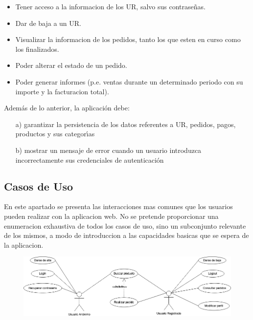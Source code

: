 \documentclass[a4paper]{report}
\begin{document}
\begin{enumerate}
\begin{itemize}
                    \item Tener acceso a la informacion de los UR, salvo sus contrase\~nas.
                    \item Dar de baja a un UR.
                    \item Visualizar la informacion de los pedidos, tanto los que esten en curso como los finalizados.
                    \item Poder alterar el estado de un pedido.
                    \item Poder generar informes (p.e. ventas durante un determinado periodo con su importe y la facturacion total).
                \end{itemize}
            \end{enumerate}

            Adem\'as de lo anterior, la aplicaci\'on debe:
            \begin{enumerate}
                \item[a)] garantizar la persistencia de los datos referentes a UR, pedidos, pagos, productos y sus categor\'\i{}as
                \item[b)] mostrar un mensaje de error cuando un usuario introduzca incorrectamente sus credenciales de autenticaci\'on
            \end{enumerate}

        \subsection{Casos de Uso}
            En este apartado se presenta las interacciones mas comunes que los usuarios pueden realizar con la aplicacion web.
            No se pretende proporcionar una enumeracion exhaustiva de todos los casos de uso, sino un subconjunto relevante
            de los mismos, a modo de introduccion a las capacidades basicas que se espera de la aplicacion.

            \begin{figure}[h]
                \centering
                \includegraphics[width=\textwidth]{Use-Case_Diagram}
            \end{figure}
\end{document}
